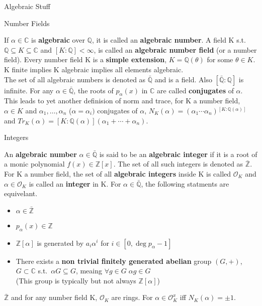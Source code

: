 \documentclass[12pt, letterpaper]{article}
\newcommand{\C}{\mathbb{C}}
\newcommand{\Q}{\mathbb{Q}}
\newcommand{\Z}{\mathbb{Z}}
\newcommand{\Ok}{\mathcal{O}}
\begin{document}
\begin{section}{Algebraic Stuff}

  \begin{subsection}{Number Fields}

    If \(\alpha \in \C\) is \textbf{algebraic} over \(\Q\), it
    is called an \textbf{algebraic number}. A field K s.t.\
    \(\Q \subseteq K \subseteq \C\) and \([K : \Q] <
    \infty\), is called an \textbf{algebraic number field} (or a number
    field). Every number field K is a \textbf{simple extension}, \(K =
    \Q(\theta)\) for some \(\theta \in K\). K finite implies K
    algebraic implies all elements algebraic. \\
    The set of all algebraic numbers is denoted as \(\bar{\Q}\) and is
    a field. Also \([\bar{\Q} : \Q]\) is infinite. For any
    \(\alpha \in \bar{\Q}\), the roots of \(p_{\alpha}(x)\) in
    \(\C\) are called \textbf{conjugates} of \(\alpha\). \\
    This leads to yet another definision of norm and trace, for K a number
    field, \(\alpha \in K\) and \(\alpha_{1}, \dots , \alpha_{n}\) (\(\alpha =
    \alpha_{i})\) conjugates of \(\alpha\), \(N_{K}(\alpha) = (\alpha_{1}
    \cdots \alpha_{n}){} ^{[K : \Q(\alpha)]}\) and \(Tr_{K}(\alpha) =
    [K : \Q(\alpha)](\alpha_{1} + \cdots + \alpha_{n})\).

  \end{subsection}

  \begin{subsection}{Integers}

    An \textbf{algebraic number} \(\alpha \in \bar{\Q}\) is said to be
    an \textbf{algebraic integer} if it is a root of a monic polynomial
    \(f(x) \in \Z[x]\). The set of all such integers is denoted as
    \(\bar{\Z}\). For K a number field, the set of all
    \textbf{algebraic integers} inside K is called \(\Ok_{K}\) and
    \(\alpha \in \Ok_{K}\) is called an \textbf{integer} in K. For
    \(\alpha \in \bar{\Q}\), the following statments are equivelant.
    \begin{itemize}
      \item \(\alpha \in \bar{\Z}\)
      \item \(p_{\alpha}(x) \in \Z\)
      \item \(\Z[\alpha]\) is generated by \(a_{i} \alpha^{i}\)
            for \(i \in [0, \deg p_{\alpha} - 1]\)
      \item There exists a \textbf{non trivial finitely generated abelian}
            group \((G, +)\), \(G \subset \C\) s.t.\ \(\alpha G
            \subseteq G\), meaing \(\forall g \in G \; \alpha g \in G\) \\
            (This group is typically but not always \(\Z[\alpha]\))
    \end{itemize}
    \(\bar{\Z}\) and for any number field K, \(\Ok_{K}\) are
    rings. For \(\alpha \in \Ok_{K}^{x}\) iff \(N_{K}(\alpha) =
    \pm 1\).


\end{subsection}
\end{section}
\end{document}
